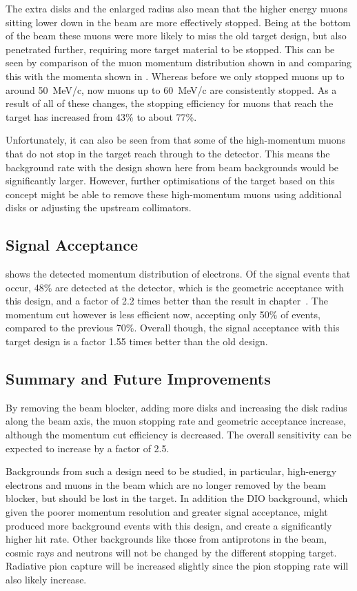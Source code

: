 The extra disks and the enlarged radius also mean that the higher energy muons sitting lower down in the beam are more effectively stopped.
Being at the bottom of the beam these muons were more likely to miss the old target design, but also penetrated further, requiring more target material to be stopped.
This can be seen by comparison of the muon momentum distribution shown in  and comparing this with the momenta shown in .
Whereas before we only stopped muons up to around 50~MeV/c, now muons up to 60~MeV/c are consistently stopped.
As a result of all of these changes, the stopping efficiency for muons that reach the target has increased from 43\% to about 77\%.

Unfortunately, it can also be seen from  that some of the high-momentum muons that do not stop in the target reach through to the detector.
This means the background rate with the design shown here from beam backgrounds would be significantly larger.
However, further optimisations of the target based on this concept might be able to remove these high-momentum muons using additional disks or adjusting the upstream collimators.

\subsection{Signal Acceptance}
 shows the detected momentum distribution of electrons.
Of the signal events that occur, 48\% are detected at the detector, which is the geometric acceptance with this design, and a factor of 2.2 times better than the result in chapter~.
The momentum cut however is less efficient now, accepting only 50\% of events, compared to the previous 70\%.  
Overall though, the signal acceptance with this target design is a factor 1.55 times better than the old design.

\subsection{Summary and Future Improvements}
By removing the beam blocker, adding more disks and increasing the disk radius along the beam axis, the muon stopping rate and geometric acceptance increase, although the momentum cut efficiency is decreased.
The overall sensitivity can be expected to increase by a factor of 2.5.

Backgrounds from such a design need to be studied, in particular, high-energy electrons and muons in the beam which are no longer removed by the beam blocker, but should be lost in the target.
In addition the \ac{DIO} background, which given the poorer momentum resolution and greater signal acceptance, might produced more background events with this design, and create a significantly higher hit rate.
Other backgrounds like those from antiprotons in the beam, cosmic rays and neutrons will not be changed by the different stopping target.
Radiative pion capture will be increased slightly since the pion stopping rate will also likely increase.

